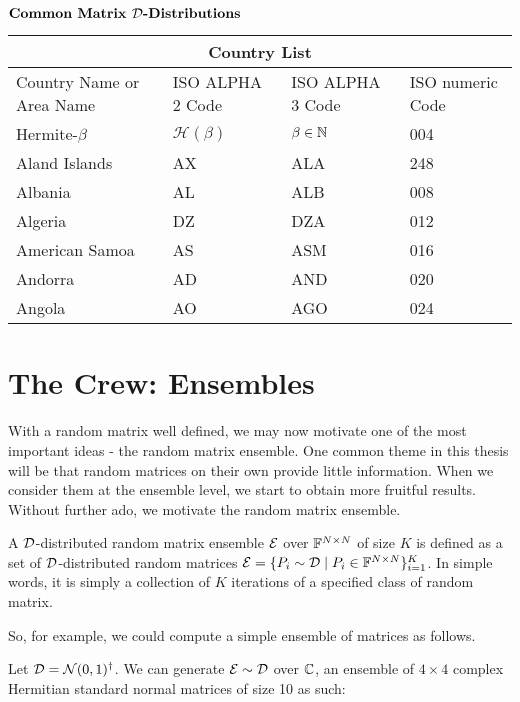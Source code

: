 \begin{center}
$\textbf{Common Matrix $\mathcal{D}$-Distributions}$
\end{center}

\begin{tabular}{ |p{3cm}||p{3cm}|p{3cm}|p{3cm}|  }
 \hline
 \multicolumn{4}{|c|}{Country List} \\
 \hline
 Country Name     or Area Name& ISO ALPHA 2 Code &ISO ALPHA 3 Code&ISO numeric Code\\
 \hline
 Hermite-$\beta$   & $\mathcal{H}(\beta)$    & $\beta \in \mathbb{N}$ &   004\\
 Aland Islands&   AX  & ALA   &248\\
 Albania &AL & ALB&  008\\
 Algeria    &DZ & DZA&  012\\
 American Samoa&   AS  & ASM&016\\
 Andorra& AD  & AND   &020\\
 Angola& AO  & AGO&024\\
 \hline
\end{tabular}

\newpage

\section{The Crew: Ensembles}

With a random matrix well defined, we may now motivate one of the most important ideas - the random matrix ensemble. One common theme in this thesis will be that random matrices on their own provide little information. When we consider them at the ensemble level, we start to obtain more fruitful results. Without further ado, we motivate the random matrix ensemble.

\begin{definition}
A $\mathcal{D}$-distributed random matrix ensemble $\mathcal{E}$ over $\mathbb{F}^{N \times N}$ of size $K$ is defined as a set of $\mathcal{D}$-distributed random matrices $\mathcal{E} = \{P_i \sim \mathcal{D} \mid P_i \in \mathbb{F}^{N \times N}\}_{i = 1}^K$. In simple words, it is simply a collection of $K$ iterations of a specified class of random matrix.
\end{definition}

So, for example, we could compute a simple ensemble of matrices as follows.

\begin{code}
Let $\mathcal{D} = \mathcal{N}(0,1)^{\dagger}$. We can generate $\mathcal{E} \sim \mathcal{D}$ over $\mathbb{C}$, an ensemble of $4 \times 4$ complex Hermitian standard normal matrices of size 10 as such:
\end{code}

